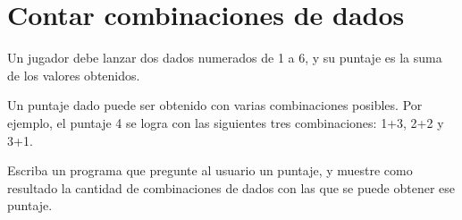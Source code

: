 \section{Contar combinaciones de dados}

Un jugador debe lanzar dos dados numerados de 1 a 6, y su puntaje es la
suma de los valores obtenidos.

Un puntaje dado puede ser obtenido con varias combinaciones posibles.
Por ejemplo, el puntaje 4 se logra con las siguientes tres
combinaciones: 1+3, 2+2 y 3+1.

Escriba un programa que pregunte al usuario un puntaje, y muestre como
resultado la cantidad de combinaciones de dados con las que se puede
obtener ese puntaje.
